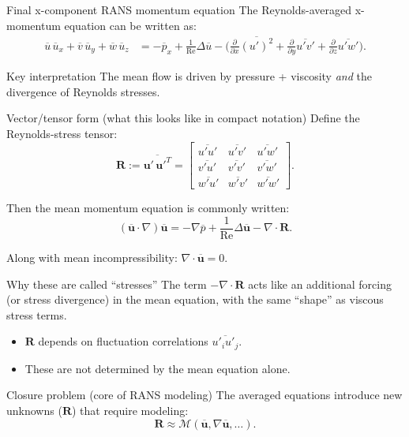 \documentclass[aspectratio=169]{beamer}
\newcommand{\uu}{\bm{u}}
\newcommand{\Rey}{\mathrm{Re}}
\newcommand{\avg}[1]{\overline{#1}}
\newcommand{\up}{\uu'}
\newcommand{\ubar}{\avg{\uu}}
\newcommand{\grad}{\nabla}
\newcommand{\Div}{\nabla\cdot}
\newcommand{\Lap}{\Delta}
\begin{document}
\begin{frame}{Final x-component RANS momentum equation}
The Reynolds-averaged x-momentum equation can be written as:
\begin{align*}
\avg{u}\,\avg{u}_x
+\avg{v}\,\avg{u}_y
+\avg{w}\,\avg{u}_z
&=
-\avg{p}_x
+\frac{1}{\Rey}\Lap\avg{u}
-\Big(
\frac{\partial}{\partial x}\avg{(u')^2}
+\frac{\partial}{\partial y}\avg{u'v'}
+\frac{\partial}{\partial z}\avg{u'w'}
\Big).
\end{align*}

\begin{block}{Key interpretation}
The mean flow is driven by pressure + viscosity \emph{and} the divergence of Reynolds stresses.
\end{block}
\end{frame}

\begin{frame}{Vector/tensor form (what this looks like in compact notation)}
Define the Reynolds-stress tensor:
\[
\bm{R} := \avg{\up\,\up^{T}}
=
\begin{bmatrix}
\avg{u'u'} & \avg{u'v'} & \avg{u'w'}\\
\avg{v'u'} & \avg{v'v'} & \avg{v'w'}\\
\avg{w'u'} & \avg{w'v'} & \avg{w'w'}
\end{bmatrix}.
\]

Then the mean momentum equation is commonly written:
\[
(\ubar\cdot\grad)\ubar
=
-\grad \avg{p}
+\frac{1}{\Rey}\Lap \ubar
-\Div \bm{R}.
\]

Along with mean incompressibility: \;\; $\Div\ubar=0$.
\end{frame}

\begin{frame}{Why these are called ``stresses''}
The term $-\Div\bm{R}$ acts like an additional forcing (or stress divergence)
in the mean equation, with the same ``shape'' as viscous stress terms.

\begin{itemize}
  \item $\bm{R}$ depends on fluctuation correlations $\avg{u'_i u'_j}$.
  \item These are not determined by the mean equation alone.
\end{itemize}

\begin{block}{Closure problem (core of RANS modeling)}
The averaged equations introduce new unknowns ($\bm{R}$) that require modeling:
\[
\bm{R} \approx \mathcal{M}(\ubar, \grad \ubar, \ldots).
\]
\end{block}
\end{frame}
\end{document}
